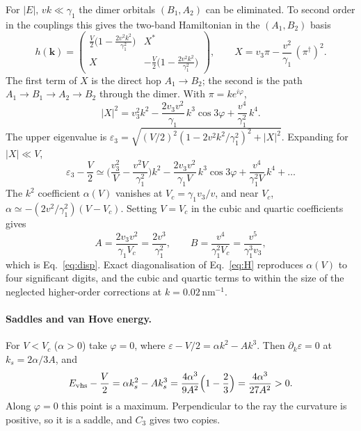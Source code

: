 \documentclass[11pt,a4paper]{article}
\numberwithin{equation}{section}
\newcommand{\bk}{\mathbf{k}}
\newcommand{\Evhs}{E_{\rm vhs}}
\newcommand{\nm}{\,\mathrm{nm}}
\begin{document}
For $|E|,\,vk\ll\gamma_1$ the dimer orbitals $(B_1,A_2)$ can be eliminated. To second order in the couplings this gives the two-band Hamiltonian in the $(A_1,B_2)$ basis~\cite{McCann2013}
\begin{equation}
h(\bk)=\begin{pmatrix}\frac V2\Big(1-\frac{2v^2k^2}{\gamma_1^2}\Big) & X^*\\[3pt] X & -\frac V2\Big(1-\frac{2v^2k^2}{\gamma_1^2}\Big)\end{pmatrix},
\qquad X=v_3\pi-\frac{v^2}{\gamma_1}\,(\pi^\dagger)^2 .
\end{equation}
The first term of $X$ is the direct hop $A_1\to B_2$; the second is the path $A_1\to B_1\to A_2\to B_2$ through the dimer. With $\pi=ke^{i\varphi}$,
\begin{equation}
|X|^2=v_3^2k^2-\frac{2v_3v^2}{\gamma_1}\,k^3\cos3\varphi+\frac{v^4}{\gamma_1^2}\,k^4 .
\end{equation}
The upper eigenvalue is $\varepsilon_3=\sqrt{(V/2)^2(1-2v^2k^2/\gamma_1^2)^2+|X|^2}$. Expanding for $|X|\ll V$,
\begin{equation}
\varepsilon_3-\frac V2\simeq\Big(\frac{v_3^2}{V}-\frac{v^2V}{\gamma_1^2}\Big)k^2-\frac{2v_3v^2}{\gamma_1V}\,k^3\cos3\varphi+\frac{v^4}{\gamma_1^2V}\,k^4+\dots
\end{equation}
The $k^2$ coefficient $\alpha(V)$ vanishes at $V_c=\gamma_1v_3/v$, and near $V_c$, $\alpha\simeq-(2v^2/\gamma_1^2)(V-V_c)$. Setting $V=V_c$ in the cubic and quartic coefficients gives
\begin{equation}
A=\frac{2v_3v^2}{\gamma_1V_c}=\frac{2v^3}{\gamma_1^2},\qquad B=\frac{v^4}{\gamma_1^2V_c}=\frac{v^5}{\gamma_1^3v_3},
\end{equation}
which is Eq.~\eqref{eq:disp}. Exact diagonalisation of Eq.~\eqref{eq:H} reproduces $\alpha(V)$ to four significant digits, and the cubic and quartic terms to within the size of the neglected higher-order corrections at $k=0.02\nm^{-1}$.

\paragraph{Saddles and van Hove energy.}
For $V<V_c$ ($\alpha>0$) take $\varphi=0$, where $\varepsilon-V/2=\alpha k^2-Ak^3$. Then $\partial_k\varepsilon=0$ at $k_s=2\alpha/3A$, and
\begin{equation}
\Evhs-\frac V2=\alpha k_s^2-Ak_s^3=\frac{4\alpha^3}{9A^2}\Big(1-\frac23\Big)=\frac{4\alpha^3}{27A^2}>0 .
\end{equation}
Along $\varphi=0$ this point is a maximum. Perpendicular to the ray the curvature is positive, so it is a saddle, and $C_3$ gives two copies.
\end{document}
